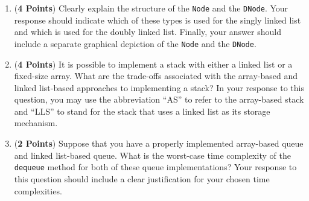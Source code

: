\documentclass[12pt]{article}
\begin{document}
\begin{enumerate}
\begin{enumerate}

          \item ({\bf 4 Points}) Clearly explain the structure of the {\tt Node} and the {\tt DNode}.  Your response
            should indicate which of these types is used for the singly linked list and which is used for the doubly
            linked list.  Finally, your answer should include a separate graphical depiction of the {\tt Node} and the
            {\tt DNode}.


          \item ({\bf 4 Points}) It is possible to implement a stack with either a linked list or a fixed-size array.
            What are the trade-offs associated with the array-based and linked list-based approaches to implementing a
            stack?  In your response to this question, you may use the abbreviation ``AS'' to refer to the array-based
            stack and ``LLS'' to stand for the stack that uses a linked list as its storage mechanism.

          \item ({\bf 2 Points}) Suppose that you have a properly implemented array-based queue and linked list-based
            queue.  What is the worst-case time complexity of the {\tt dequeue} method for both of these queue
            implementations?  Your response to this question should include a clear justification for your chosen
            time complexities.



\end{enumerate}
\end{enumerate}
\end{document}
